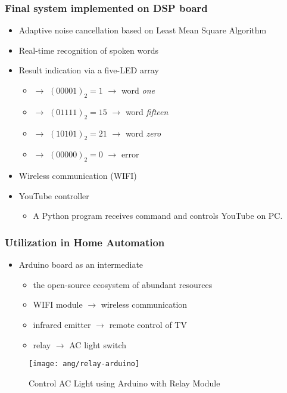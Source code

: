 
\begin{frame}
\frametitle{Final system implemented on DSP board}
\begin{itemize}
	\item Adaptive noise cancellation based on Least Mean Square Algorithm
	\item Real-time recognition of spoken words
	\item Result indication via a five-LED array
		\begin{itemize}
		\item \LED\offLED\offLED\offLED\offLED\onLED $\longrightarrow$ $(00001)_2 = 1$ $\longrightarrow$ word \textit{one}
		\item \LED\offLED\onLED\onLED\onLED\onLED $\longrightarrow$ $(01111)_2 = 15$ $\longrightarrow$ word \textit{fifteen}
		\item \LED\onLED\offLED\onLED\offLED\onLED $\longrightarrow$ $(10101)_2 = 21$ $\longrightarrow$ word \textit{zero}
		\item \LED\offLED\offLED\offLED\offLED\offLED $\longrightarrow$ $(00000)_2 = 0$ $\longrightarrow$ error
		\end{itemize}
	\item Wireless communication (WIFI)
	\item YouTube controller
		\begin{itemize}
		\item A Python program receives command and controls YouTube on PC.
		\end{itemize}
\end{itemize}
\end{frame}


\begin{frame}
\frametitle{Utilization in Home Automation}
\begin{itemize}
	\item Arduino\textsuperscript{\textregistered} board as an intermediate
		\begin{itemize}
		\item the open-source ecosystem of abundant resources
		\item WIFI module $\longrightarrow$ wireless communication
		\item infrared emitter $\longrightarrow$ remote control of TV
		\item relay $\longrightarrow$ AC light switch
		\end{itemize}
\end{itemize}

\begin{figure}[H]
\centering
\texttt{[image: ang/relay-arduino]}
\caption{Control AC Light using Arduino with Relay Module \cite{relay-arduino}}
\end{figure}
\end{frame}

